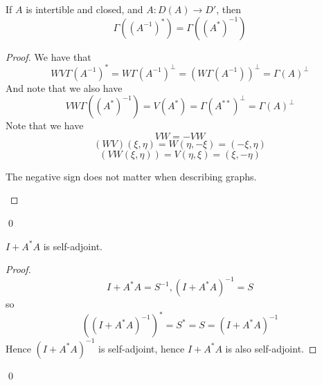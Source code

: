 \begin{proposition}
    If $A$ is intertible and closed, and $A:D(A)\to D'$, then
    \begin{equation*}
        \Gamma((A^{-1})^*)=\Gamma((A^*)^{-1})
    \end{equation*}
\end{proposition}
\begin{proof}
    We have that
    \begin{equation*}
        WV\Gamma(A^{-1})^*=W \Gamma(A^{-1})^\perp=(W\Gamma(A^{-1}))^\perp=\Gamma(A)^\perp
    \end{equation*}
    And note that we also have
    \begin{equation*}
        VW\Gamma((A^*)^{-1})=V(A^*)=\Gamma(A^{**})^\perp=\Gamma(A)^\perp
    \end{equation*}
    Note that we have
    \begin{equation*}
        VW=-VW
    \end{equation*}
    \begin{equation*}
        (WV)(\xi,\eta)=W(\eta,-\xi)=(-\xi, \eta)
    \end{equation*}
    \begin{equation*}
        (VW(\xi, \eta))=V(\eta,\xi)=(\xi, -\eta)
    \end{equation*}
    \begin{note}
        The negative sign does not matter when describing graphs.
    \end{note}
\end{proof}
\qed

\begin{theorem}
    $I+A^*A$ is self-adjoint.
\end{theorem}
\begin{proof}
    \begin{equation*}
        I+A^*A=S^{-1}, (I+A^*A)^{-1}=S
    \end{equation*}
    so
    \begin{equation*}
        ((I+A^*A)^{-1})^*=S^*=S=(I+A^*A)^{-1}
    \end{equation*}
    Hence $(I+A^*A)^{-1}$ is self-adjoint, hence $I+A^*A$ is also self-adjoint. 
\end{proof}
\qed

